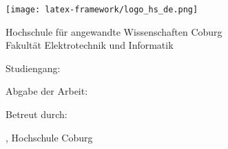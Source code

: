 \begin{titlepage}
  \centering
  \texttt{[image: latex-framework/logo\_hs\_de.png]}

  \begin{Large}
  Hochschule für angewandte Wissenschaften Coburg\\
  Fakultät Elektrotechnik und Informatik\par
  \end{Large}
  \vspace{1.5cm}

  \Large{Studiengang: \Studiengang}
  \vspace{1.5cm}

  \Large{\Arbeit}
  \vspace{1cm}

  \Huge{\Titel}
  \vspace{2cm}

  \huge{\Autorenname}
  \vspace{2cm}

  \Large{Abgabe der Arbeit: \Abgabe}

  \Large{Betreut durch:}

  \Large{\Dozent, Hochschule Coburg}
\end{titlepage}